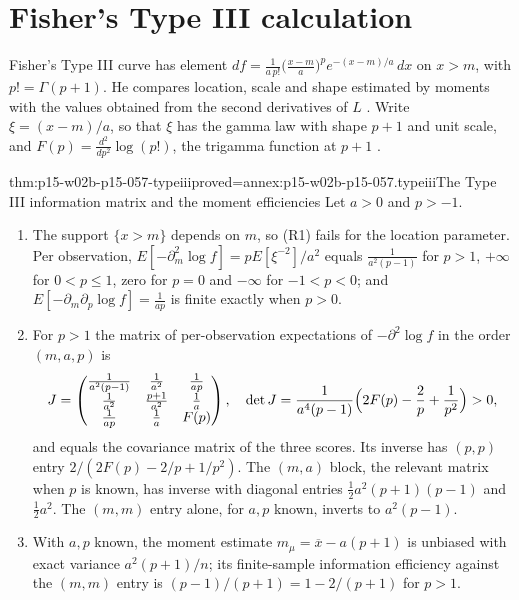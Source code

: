 \section{Fisher's Type III calculation}
\label{sec:p15-w02b-p15-057-type-iii}

Fisher's Type III curve has element
\(df=\frac{1}{a\,p!}\bigl(\frac{x-m}{a}\bigr)^pe^{-(x-m)/a}\,dx\) on
\(x>m\), with \(p!=\Gamma(p+1)\). He compares location, scale and shape
estimated by moments with the values obtained from the second derivatives
of \(L\) \cite[pp.~332--337]{Fisher1922Foundations}. Write
\(\xi=(x-m)/a\), so that \(\xi\) has the gamma law with shape \(p+1\) and
unit scale, and \(F(p)=\frac{d^2}{dp^2}\log(p!)\), the trigamma function
at \(p+1\) \cite[p.~336]{Fisher1922Foundations}.

\begin{hbtheorem}{thm:p15-w02b-p15-057-typeiii}{proved=annex:p15-w02b-p15-057.typeiii}{The Type III information matrix and the moment efficiencies}
Let \(a>0\) and \(p>-1\).
\begin{enumerate}
\item The support \(\{x>m\}\) depends on \(m\), so (R1) fails for the
 location parameter. Per observation,
 \(E[-\partial_m^2\log f]=pE[\xi^{-2}]/a^2\) equals
 \(\frac{1}{a^2(p-1)}\) for \(p>1\), \(+\infty\) for \(0<p\leq1\), zero for
 \(p=0\) and \(-\infty\) for \(-1<p<0\); and
 \(E[-\partial_m\partial_p\log f]=\frac1{ap}\) is finite exactly when
 \(p>0\).
\item For \(p>1\) the matrix of per-observation expectations of
 \(-\partial^2\log f\) in the order \((m,a,p)\) is
 \[
  J=\begin{pmatrix}\frac{1}{a^2(p-1)}&\frac1{a^2}&\frac1{ap}\\
  \frac1{a^2}&\frac{p+1}{a^2}&\frac1a\\
  \frac1{ap}&\frac1a&F(p)\end{pmatrix},
  \quad
  \det J=\frac{1}{a^4(p-1)}\Bigl(2F(p)-\frac2p+\frac1{p^2}\Bigr)>0,
 \]
 and equals the covariance matrix of the three scores. Its inverse has
 \((p,p)\) entry \(2/(2F(p)-2/p+1/p^2)\). The \((m,a)\) block, the
 relevant matrix when \(p\) is known, has inverse with diagonal entries
 \(\tfrac12a^2(p+1)(p-1)\) and \(\tfrac12a^2\).
 The \((m,m)\) entry alone, for \(a,p\) known, inverts to
 \(a^2(p-1)\).
\item With \(a,p\) known, the moment estimate
 \(m_\mu=\overline x-a(p+1)\) is unbiased with exact variance
 \(a^2(p+1)/n\); its finite-sample information efficiency against the
 \((m,m)\) entry is \((p-1)/(p+1)=1-2/(p+1)\) for \(p>1\).

\end{enumerate}
\end{hbtheorem}
